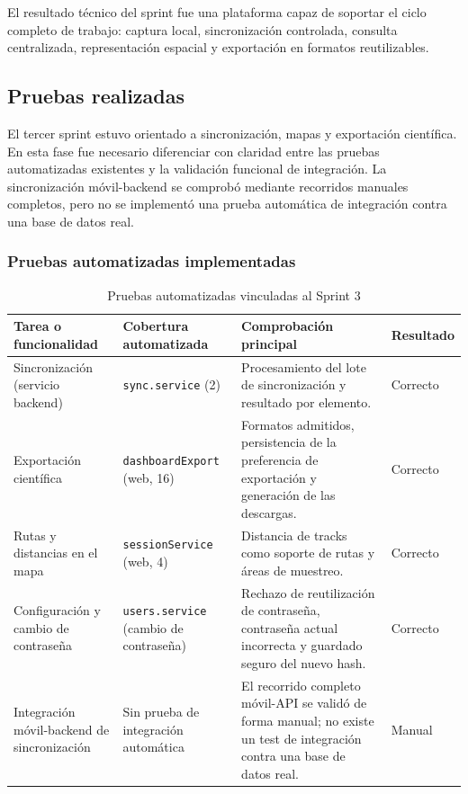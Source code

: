 El resultado técnico del sprint fue una plataforma capaz de soportar el ciclo
completo de trabajo: captura local, sincronización controlada, consulta
centralizada, representación espacial y exportación en formatos reutilizables.
\subsection{Pruebas realizadas}

El tercer sprint estuvo orientado a sincronización, mapas y exportación científica. En esta fase fue necesario diferenciar con claridad entre las pruebas automatizadas existentes y la validación funcional de integración. La sincronización móvil-backend se comprobó mediante recorridos manuales completos, pero no se implementó una prueba automática de integración contra una base de datos real.

\subsubsection{Pruebas automatizadas implementadas}

\begin{table}[H]
\centering
\caption{Pruebas automatizadas vinculadas al Sprint 3}
\label{tab:pruebas_automatizadas_sprint3}
\scriptsize
\begin{tabularx}{\textwidth}{p{3.5cm}p{3cm}X p{1.8cm}}
\toprule
Tarea o funcionalidad & Cobertura automatizada & Comprobación principal & Resultado \\
\midrule
Sincronización (servicio backend) & \texttt{sync.service} (2) & Procesamiento del lote de sincronización y resultado por elemento. & Correcto \\
Exportación científica & \texttt{dashboardExport} (web, 16) & Formatos admitidos, persistencia de la preferencia de exportación y generación de las descargas. & Correcto \\
Rutas y distancias en el mapa & \texttt{sessionService} (web, 4) & Distancia de tracks como soporte de rutas y áreas de muestreo. & Correcto \\
Configuración y cambio de contraseña & \texttt{users.service} (cambio de contraseña) & Rechazo de reutilización de contraseña, contraseña actual incorrecta y guardado seguro del nuevo hash. & Correcto \\
Integración móvil-backend de sincronización & Sin prueba de integración automática & El recorrido completo móvil-API se validó de forma manual; no existe un test de integración contra una base de datos real. & Manual \\
\bottomrule
\end{tabularx}
\end{table}

